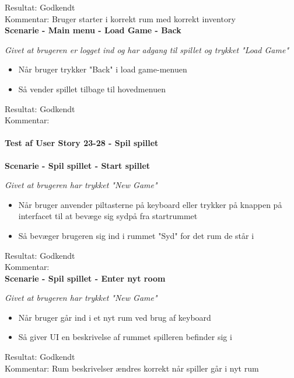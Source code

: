 Resultat: Godkendt\\
Kommentar: Bruger starter i korrekt rum med korrekt inventory\\

\textbf{Scenarie - Main menu - Load Game - Back}

\textit{Givet at brugeren er logget ind og har adgang til spillet og trykket "Load Game"}

\begin{itemize}
  \item Når bruger trykker "Back" i load game-menuen
  \item Så vender spillet tilbage til hovedmenuen
\end{itemize}

Resultat: Godkendt\\
Kommentar:\\

\paragraph{Test af User Story 23-28 - Spil spillet}

\textbf{Scenarie - Spil spillet - Start spillet}

\textit{Givet at brugeren har trykket "New Game"}

\begin{itemize}
  \item Når bruger anvender piltasterne på keyboard eller trykker på knappen på interfacet til at bevæge sig sydpå fra startrummet
  \item Så bevæger brugeren sig ind i rummet "Syd" for det rum de står i
\end{itemize}

Resultat: Godkendt\\
Kommentar:\\

\textbf{Scenarie - Spil spillet - Enter nyt room}

\textit{Givet at brugeren har trykket "New Game"}

\begin{itemize}
  \item Når bruger går ind i et nyt rum ved brug af keyboard
  \item Så giver UI en beskrivelse af rummet spilleren befinder sig i
\end{itemize}

Resultat: Godkendt\\
Kommentar: Rum beskrivelser ændres korrekt når spiller går i nyt rum\\

